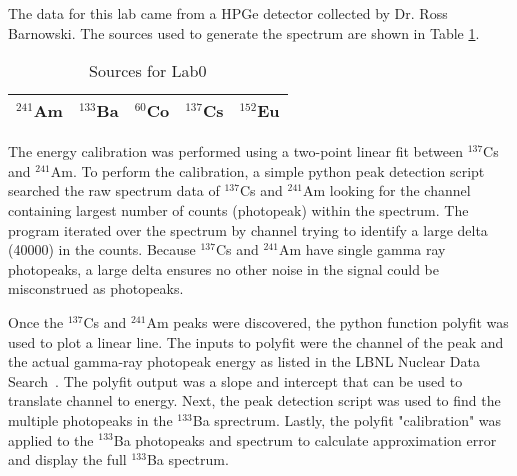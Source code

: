 The data for this lab came from a HPGe detector collected by Dr. Ross Barnowski. The sources used to generate the spectrum are shown in Table \ref{tab:sources}.

\begin{table}[H]
\centering
\caption{Sources for Lab0}
\label{tab:sources}
\begin{tabular}{@{}lllll@{}}
\toprule
$^{241}$Am & $^{133}$Ba & $^{60}$Co & $^{137}$Cs & $^{152}$Eu \\ \bottomrule
\end{tabular}
\end{table}

The energy calibration was performed using a two-point linear fit between $^{137}$Cs and $^{241}$Am. To perform the calibration, a simple python peak detection script searched the raw spectrum data of $^{137}$Cs and $^{241}$Am looking for the channel containing largest number of counts (photopeak) within the spectrum. The program iterated over the spectrum by channel trying to identify a large delta (40000) in the counts. Because $^{137}$Cs and $^{241}$Am have single gamma ray photopeaks, a large delta ensures no other noise in the signal could be misconstrued as photopeaks.

Once the $^{137}$Cs and $^{241}$Am peaks were discovered, the python function polyfit was used to plot a linear line. The inputs to polyfit were the channel of the peak and the actual gamma-ray photopeak energy as listed in the LBNL Nuclear Data Search~\cite{chu_ekstrom_firestone_1999}. The polyfit output was a slope and intercept that can be used to translate channel to energy. Next, the peak detection script was used to find the multiple photopeaks in the $^{133}$Ba sprectrum. Lastly, the polyfit "calibration" was applied to the $^{133}$Ba photopeaks and spectrum to calculate approximation error and display the full $^{133}$Ba spectrum.
